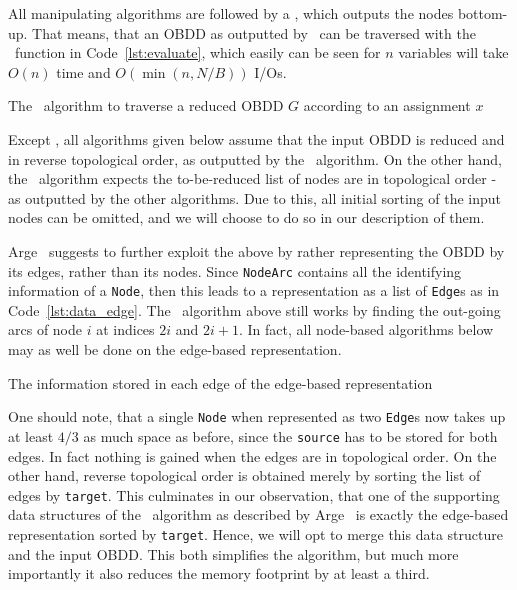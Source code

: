 All manipulating algorithms are followed by a \Reduce, which outputs the nodes
bottom-up. That means, that an OBDD as outputted by \Reduce\ can be traversed
with the \Evaluate\ function in Code~\ref{lst:evaluate}, which easily can be
seen for $n$ variables will take $O(n)$ time and $O(\min(n, N/B))$ I/Os.
\begin{lstfloat}[ht!]
  \centering

  

  \caption{The \Evaluate\ algorithm to traverse a reduced OBDD $G$ according to an
    assignment $x$}
  \label{lst:evaluate}
\end{lstfloat}

Except \Reduce, all algorithms given below assume that the input OBDD is reduced
and in reverse topological order, as outputted by the \Reduce\ algorithm. On the
other hand, the \Reduce\ algorithm expects the to-be-reduced list of nodes are
in topological order - as outputted by the other algorithms. Due to this, all
initial sorting of the input nodes can be omitted, and we will choose to do so
in our description of them. \cite{Arge96}

Arge~\cite{Arge96} suggests to further exploit the above by rather representing
the OBDD by its edges, rather than its nodes. Since \lstinline{NodeArc} contains
all the identifying information of a \lstinline{Node}, then this leads to a
representation as a list of \lstinline{Edge}s as in Code~\ref{lst:data_edge}.
The \Evaluate\ algorithm above still works by finding the out-going arcs of node
$i$ at indices $2i$ and $2i+1$. In fact, all node-based algorithms below may as
well be done on the edge-based representation.

\begin{lstfloat}[ht!]
  \centering

  

  \caption{The information stored in each edge of the edge-based representation}
  \label{lst:data_edge}
\end{lstfloat}

One should note, that a single \lstinline{Node} when represented as two
\lstinline{Edge}s now takes up at least $4/3$ as much space as before, since the
\lstinline{source} has to be stored for both edges. In fact nothing is gained
when the edges are in topological order. On the other hand, reverse topological
order is obtained merely by sorting the list of edges by \lstinline{target}.
This culminates in our observation, that one of the supporting data structures
of the \Reduce\ algorithm as described by Arge~\cite{Arge96} is exactly the
edge-based representation sorted by \lstinline{target}. Hence, we will opt to
merge this data structure and the input OBDD. This both simplifies the
algorithm, but much more importantly it also reduces the memory footprint by at
least a third.

